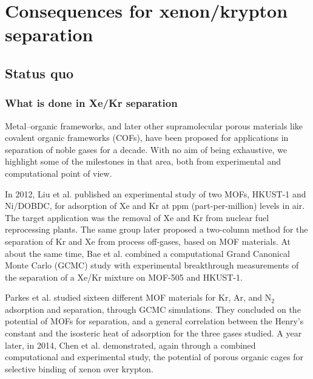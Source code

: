 \documentclass[main.tex]{subfiles}
\begin{document}
\section{Consequences for xenon/krypton separation}

\subsection{Status quo}

\subsubsection{What is done in Xe/Kr separation}

Metal--organic frameworks, and later other supramolecular porous materials like covalent organic frameworks (COFs), have been proposed for applications in separation of noble gases for a decade. With no aim of being exhaustive, we highlight some of the milestones in that area, both from experimental and computational point of view.

In 2012, Liu et al.\cite{Liu_2012} published an experimental study of two MOFs, HKUST-1 and Ni/DOBDC, for adsorption of Xe and Kr at ppm (part-per-million) levels in air. The target application was the removal of Xe and Kr from nuclear fuel reprocessing plants. The same group later proposed a two-column method for the separation of Kr and Xe from process off-gases\cite{Liu_2014}, based on MOF materials. At about the same time, Bae et al.\cite{Bae_2013} combined a computational Grand Canonical Monte Carlo (GCMC) study with experimental breakthrough measurements of the separation of a Xe/Kr mixture on MOF-505 and HKUST-1.

Parkes et al.\cite{Parkes_2013} studied sixteen different MOF materials for Kr, Ar, and N$_2$ adsorption and separation, through GCMC simulations. They concluded on the potential of MOFs for separation, and a general correlation between the Henry's constant and the isosteric heat of adsorption for the three gases studied. A year later, in 2014, Chen et al.\cite{Chen_2014} demonstrated, again through a combined computational and experimental study, the potential of porous organic cages for selective binding of xenon over krypton.
\end{document}
